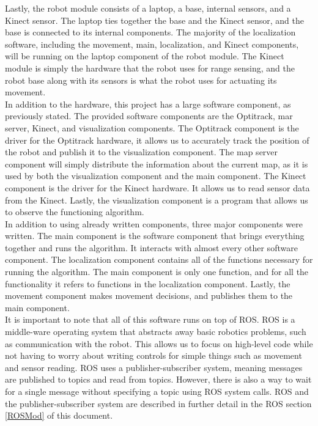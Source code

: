 \documentclass{article}
\begin{document}
Lastly, the robot module consists of a laptop, a base, internal sensors, and a Kinect sensor. The laptop ties together the base and the Kinect sensor, and the base is connected to its internal components. The majority of the localization software, including the movement, main, localization, and Kinect components, will be running on the laptop component of the robot module. The Kinect module is simply the hardware that the robot uses for range sensing, and the robot base along with its sensors is what the robot uses for actuating its movement.\\

In addition to the hardware, this project has a large software component, as previously stated. The provided software components are the Optitrack, mar server, Kinect, and visualization components. The Optitrack component is the driver for the Optitrack hardware, it allows us to accurately track the position of the robot and publish it to the visualization component. The map server component will simply distribute the information about the current map, as it is used by both the visualization component and the main component. The Kinect component is the driver for the Kinect hardware. It allows us to read sensor data from the Kinect. Lastly, the visualization component is a program that allows us to observe the functioning algorithm.\\

In addition to using already written components, three major components were written. The main component is the software component that brings everything together and runs the algorithm. It interacts with almost every other software component. The localization component contains all of the functions necessary for running the algorithm. The main component is only one function, and for all the functionality it refers to functions in the localization component. Lastly, the movement component makes movement decisions, and publishes them to the main component.\\

It is important to note that all of this software runs on top of ROS. ROS is a middle-ware operating system that abstracts away basic robotics problems, such as communication with the robot. This allows us to focus on high-level code while not having to worry about writing controls for simple things such as movement and sensor reading. ROS uses a publisher-subscriber system, meaning messages are published to topics and read from topics. However, there is also a way to wait for a single message without specifying a topic using ROS system calls. ROS and the publisher-subscriber system are described in further detail in the ROS section \ref{ROSMod} of this document.\\
\end{document}
